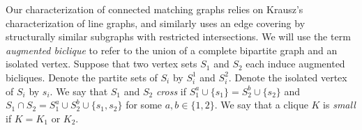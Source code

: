 Our characterization of connected matching graphs relies on Krausz's characterization of line graphs, and similarly uses an edge covering by structurally similar subgraphs with restricted intersections.  We will use the term \textit{augmented biclique} to refer to the union of a complete bipartite graph and an isolated vertex.  Suppose that two vertex sets $S_1$ and $S_2$ each induce augmented bicliques.  Denote the partite sets of $S_i$ by $S_i^1$ and $S_i^2$.  Denote the isolated vertex of $S_i$ by $s_i$.  We say that $S_1$ and $S_2$ \textit{cross} if $S_1^a \cup \{s_1\}= S_2^b\cup \{s_2\}$ and $S_1\cap S_2 = S_1^a \cup S_2^b \cup \{s_1,s_2\}$ for some $a,b \in \{1,2\}$.  We say that a clique $K$ is \textit{small} if $K =K_1$ or $K_2$.


